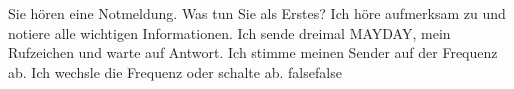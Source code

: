     {Sie hören eine Notmeldung. Was tun Sie als Erstes?}
    {Ich höre aufmerksam zu und notiere alle wichtigen Informationen.}
    {Ich sende dreimal MAYDAY, mein Rufzeichen und warte auf Antwort.}
    {Ich stimme meinen Sender auf der Frequenz ab.}
    {Ich wechsle die Frequenz oder schalte ab.}
    {false}{false}